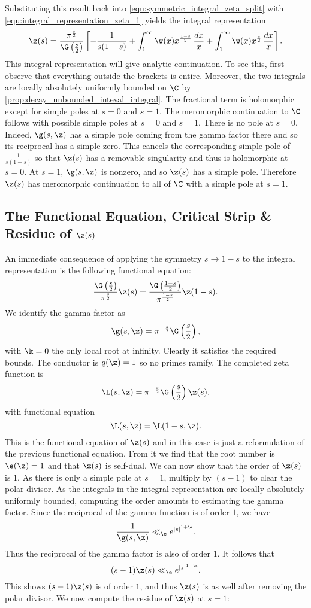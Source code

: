       Substituting this result back into \cref{equ:symmetric_integral_zeta_split} with \cref{equ:integral_representation_zeta_1} yields the integral representation
      \[
        \z(s) = \frac{\pi^{\frac{s}{2}}}{\G\left(\frac{s}{2}\right)}\left[-\frac{1}{s(1-s)}+\int_{1}^{\infty}\w(x)x^{\frac{1-s}{2}}\,\frac{dx}{x}+\int_{1}^{\infty}\w(x)x^{\frac{s}{2}}\,\frac{dx}{x}\right].
      \]
      This integral representation will give analytic continuation. To see this, first observe that everything outside the brackets is entire. Moreover, the two integrals are locally absolutely uniformly bounded on $\C$ by \cref{prop:decay_unbounded_inteval_integral}. The fractional term is holomorphic except for simple poles at $s = 0$ and $s = 1$. The meromorphic continuation to $\C$ follows with possible simple poles at $s = 0$ and $s = 1$. There is no pole at $s = 0$. Indeed, $\g(s,\z)$ has a simple pole coming from the gamma factor there and so its reciprocal has a simple zero. This cancels the corresponding simple pole of $\frac{1}{s(1-s)}$ so that $\z(s)$ has a removable singularity and thus is holomorphic at $s = 0$. At $s = 1$, $\g(s,\z)$ is nonzero, and so $\z(s)$ has a simple pole. Therefore $\z(s)$ has meromorphic continuation to all of $\C$ with a simple pole at $s = 1$. 
    \subsection*{The Functional Equation, Critical Strip \& Residue of \texorpdfstring{$\z(s)$}{\z(s)}}
      An immediate consequence of applying the symmetry $s \to 1-s$ to the integral representation is the following functional equation:
      \[
        \frac{\G\left(\frac{s}{2}\right)}{\pi^{\frac{s}{2}}}\z(s) = \frac{\G\left(\frac{1-s}{2}\right)}{\pi^{\frac{1-s}{2}}}\z(1-s).
      \]
      We identify the gamma factor as
      \[
        \g(s,\z) = \pi^{-\frac{s}{2}}\G\left(\frac{s}{2}\right),
      \]
      with $\k = 0$ the only local root at infinity. Clearly it satisfies the required bounds. The conductor is $q(\z) = 1$ so no primes ramify. The completed zeta function is
      \[
        \L(s,\z) = \pi^{-\frac{s}{2}}\G\left(\frac{s}{2}\right)\z(s),
      \]
      with functional equation
      \[
        \L(s,\z) = \L(1-s,\z).
      \]
      This is the functional equation of $\z(s)$ and in this case is just a reformulation of the previous functional equation. From it we find that the root number is $\e(\z) = 1$ and that $\z(s)$ is self-dual. We can now show that the order of $\z(s)$ is $1$. As there is only a simple pole at $s = 1$, multiply by $(s-1)$ to clear the polar divisor. As the integrals in the integral representation are locally absolutely uniformly bounded, computing the order amounts to estimating the gamma factor. Since the reciprocal of the gamma function is of order $1$, we have
      \[
        \frac{1}{\g(s,\z)} \ll_{\e} e^{|s|^{1+\e}}.
      \]
      Thus the reciprocal of the gamma factor is also of order $1$. It follows that
      \[
        (s-1)\z(s) \ll_{\e} e^{|s|^{1+\e}}.
      \]
      This shows $(s-1)\z(s)$ is of order $1$, and thus $\z(s)$ is as well after removing the polar divisor. We now compute the residue of $\z(s)$ at $s = 1$:

